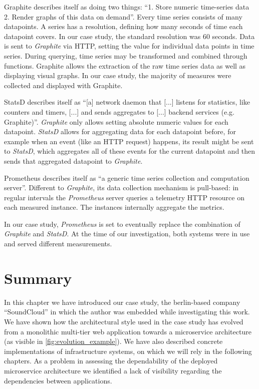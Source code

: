 \begin{tdescription}
  \item[Graphite]\cite{graphite} describes itself as doing two things: ``1. Store numeric time-series data 2. Render graphs of this data on demand''. Every time series consists of many datapoints. A series has a resolution, defining how many seconds of time each datapoint covers. In our case study, the standard resolution was 60 seconds. Data is sent to \emph{Graphite} via HTTP, setting the value for individual data points in time series. During querying, time series may be transformed and combined through functions. Graphite allows the extraction of the raw time series data as well as displaying visual graphs. In our case study, the majority of measures were collected and displayed with Graphite.
  \item[StatsD]\cite{statsd} describes itself as ``[a] network daemon that [...] listens for statistics, like counters and timers, [...] and sends aggregates to [...] backend services (e.g. Graphite)''. \emph{Graphite} only allows setting absolute numeric values for each datapoint. \emph{StatsD} allows for aggregating data for each datapoint before, for example when an event (like an HTTP request) happens, its result might be sent to \emph{StatsD}, which aggregates all of these events for the current datapoint and then sends that aggregated datapoint to \emph{Graphite}.
  \item[Prometheus]\cite{prometheus} describes itself as ``a generic time series collection and computation server''. Different to \emph{Graphite}, its data collection mechanism is pull-based: in regular intervals the \emph{Prometheus} server queries a telemetry HTTP resource on each measured instance. The instances internally aggregate the metrics.
\end{tdescription}

In our case study, \emph{Prometheus} is set to eventually replace the combination of \emph{Graphite} and \emph{StatsD}. At the time of our investigation, both systems were in use and served different measurements.

\section{Summary}

In this chapter we have introduced our case study, the berlin-based company ``SoundCloud'' in which the author was embedded while investigating this work. We have shown how the architectural style used in the case study has evolved from a monolithic multi-tier web application towards a microservice architecture (as visible in \autoref{fig:evolution_example}). We have also described concrete implementations of infrastructure systems, on which we will rely in the following chapters. As a problem in assessing the dependability of the deployed microservice architecture we identified a lack of visibility regarding the dependencies between applications.
